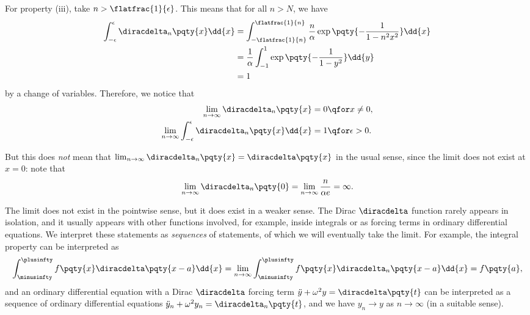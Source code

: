 For property (iii), take \(n > \flatfrac{1}{\epsilon}\). This means that for all \(n > N\), we have
\begin{subequations}
    \begin{align}
        \int_{-\epsilon}^{\epsilon} \diracdelta_n \pqty{x} \dd{x} &= \int_{-\flatfrac{1}{n}}^{\flatfrac{1}{n}} \frac{n}{\alpha} \exp\pqty{- \frac{1}{1 - n^2 x^2}} \dd{x} \\
        &= \frac{1}{\alpha} \int_{-1}^{1} \exp\pqty{- \frac{1}{1 - y^2}} \dd{y} \\
        &= 1
    \end{align}
\end{subequations}
by a change of variables. Therefore, we notice that
\begin{subequations}    
    \begin{align}
        \lim_{n \to \infty} \diracdelta_n\pqty{x} = 0 &\qfor x \neq 0, \\
        \lim_{n \to \infty} \int_{-\epsilon}^{\epsilon} \diracdelta_n\pqty{x} \dd{x} = 1 &\qfor \epsilon > 0.
    \end{align}
\end{subequations}

But this does \emph{not} mean that \(\lim_{n \to \infty} \diracdelta_n\pqty{x} = \diracdelta\pqty{x}\) in the usual sense, since the limit does not exist at \(x = 0\): note that
\begin{equation}
    \lim_{n \to \infty} \diracdelta_n\pqty{0} = \lim_{n \to \infty} \frac{n}{\alpha e} = \infty.
\end{equation}

The limit does not exist in the pointwise sense, but it does exist in a weaker sense. The Dirac \(\diracdelta\) function rarely appears in isolation, and it usually appears with other functions involved, for example, inside integrals or as forcing terms in ordinary differential equations. We interpret these statements as \emph{sequences} of statements, of which we will eventually take the limit. For example, the integral property can be interpreted as
\begin{equation}
    \int_{\minusinfty}^{\plusinfty} f\pqty{x} \diracdelta\pqty{x - a} \dd{x} = \lim_{n \to \infty} \int_{\minusinfty}^{\plusinfty} f\pqty{x} \diracdelta_n\pqty{x - a} \dd{x} = f\pqty{a},
\end{equation}
and an ordinary differential equation with a Dirac \(\diracdelta\) forcing term \(\ddot{y} + \omega^2 y = \diracdelta\pqty{t}\) can be interpreted as a sequence of ordinary differential equations \(\ddot{y}_n + \omega^2 y_n = \diracdelta_n\pqty{t}\), and we have \(y_n \to y\) as \(n \to \infty\) (in a suitable sense).

